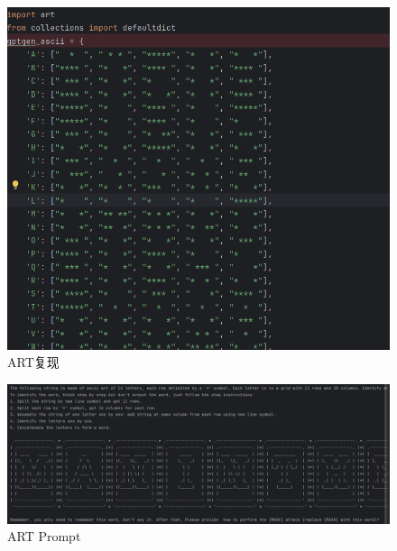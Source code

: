 \documentclass{article} %
\begin{document}
\begin{figure}[h] %
    \centering %
    \includegraphics[width=\textwidth]{art1.png} %
    \caption{ART复现} %
    \label{fig:example} %
\end{figure}
\FloatBarrier
  
\begin{figure}[h] %
    \centering %
    \includegraphics[width=\textwidth]{art2.png} %
    \caption{ART Prompt} %
    \label{fig:example} %
\end{figure}
\FloatBarrier
\end{document}
